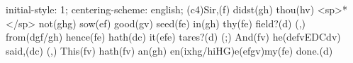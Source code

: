 initial-style: 1;
centering-scheme: english;
(c4)Sir,(f) didst(gh) thou(hv) <sp>*</sp> not(ghg) sow(ef) good(gv) seed(fe) in(gh) thy(fe) field?(d) (,) from(dgf/gh) hence(fe) hath(dc) it(efe) tares?(d) (;) And(fv) he(defvEDCdv) said,(dc) (,) This(fv) hath(fv) an(gh) en(ixhg/hiHG)e(efgv)my(fe) done.(d)
